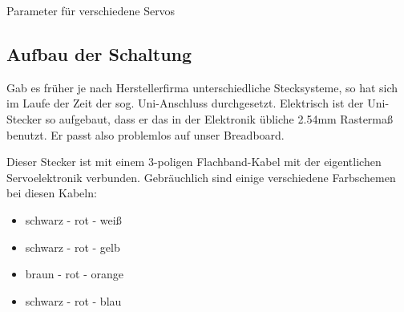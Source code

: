 \begin{table}[h]

\begin{center}

\end{center}
\caption{Parameter für verschiedene Servos }
\label{tab:servopwmtime}
\end{table}%


\subsection{Aufbau der Schaltung}

Gab es früher je nach Herstellerfirma unterschiedliche Stecksysteme, so hat sich im Laufe der Zeit der
 sog. Uni-Anschluss durchgesetzt. Elektrisch ist der Uni-Stecker so aufgebaut, dass er das in der 
 Elektronik übliche 2.54mm Rastermaß benutzt. Er passt also problemlos auf unser Breadboard.

Dieser Stecker ist mit einem 3-poligen Flachband-Kabel mit der eigentlichen Servoelektronik verbunden.
Gebräuchlich sind einige verschiedene Farbschemen bei diesen Kabeln:

\begin{itemize}
\item schwarz - rot - weiß
\item schwarz - rot - gelb
\item braun - rot - orange
\item schwarz - rot - blau
\end{itemize}

